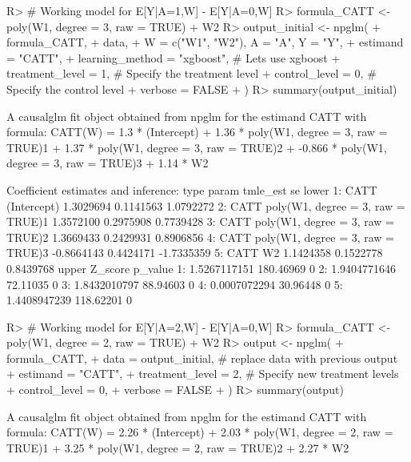 \documentclass[
]{jss}
\begin{document}
\begin{CodeChunk}
\begin{CodeInput}
R> # Working model for E[Y|A=1,W] - E[Y|A=0,W]
R> formula_CATT <- ~ poly(W1, degree = 3, raw = TRUE) + W2
R> output_initial <- npglm(
+       formula_CATT, 
+       data,
+       W = c("W1", "W2"), A = "A", Y = "Y",
+       estimand = "CATT", 
+       learning_method = "xgboost", # Lets use xgboost
+       treatment_level = 1, # Specify the treatment level
+       control_level = 0, # Specify the control level
+       verbose = FALSE
+       )
R> summary(output_initial)
\end{CodeInput}
\begin{CodeOutput}
A causalglm fit object obtained from npglm for the estimand CATT with formula: 
CATT(W) = 1.3 * (Intercept) + 1.36 * poly(W1, degree = 3, raw = TRUE)1 + 1.37 * poly(W1, degree = 3, raw = TRUE)2 + -0.866 * poly(W1, degree = 3, raw = TRUE)3 + 1.14 * W2

Coefficient estimates and inference:
   type                             param   tmle_est        se      lower
1: CATT                       (Intercept)  1.3029694 0.1141563  1.0792272
2: CATT poly(W1, degree = 3, raw = TRUE)1  1.3572100 0.2975908  0.7739428
3: CATT poly(W1, degree = 3, raw = TRUE)2  1.3669433 0.2429931  0.8906856
4: CATT poly(W1, degree = 3, raw = TRUE)3 -0.8664143 0.4424171 -1.7335359
5: CATT                                W2  1.1424358 0.1522778  0.8439768
          upper   Z_score p_value
1: 1.5267117151 180.46969       0
2: 1.9404771646  72.11035       0
3: 1.8432010797  88.94603       0
4: 0.0007072294  30.96448       0
5: 1.4408947239 118.62201       0
\end{CodeOutput}
\begin{CodeInput}
R> # Working model for E[Y|A=2,W] - E[Y|A=0,W]
R> formula_CATT <- ~ poly(W1, degree = 2, raw = TRUE) + W2
R> output <- npglm(
+       formula_CATT, 
+       data = output_initial, # replace data with previous output
+       estimand = "CATT", 
+       treatment_level = 2,  # Specify new treatment levels
+       control_level = 0,
+       verbose = FALSE
+       )
R> summary(output)
\end{CodeInput}
\begin{CodeOutput}
A causalglm fit object obtained from npglm for the estimand CATT with formula: 
CATT(W) = 2.26 * (Intercept) + 2.03 * poly(W1, degree = 2, raw = TRUE)1 + 3.25 * poly(W1, degree = 2, raw = TRUE)2 + 2.27 * W2


\end{CodeOutput}
\end{CodeChunk}
\end{document}
